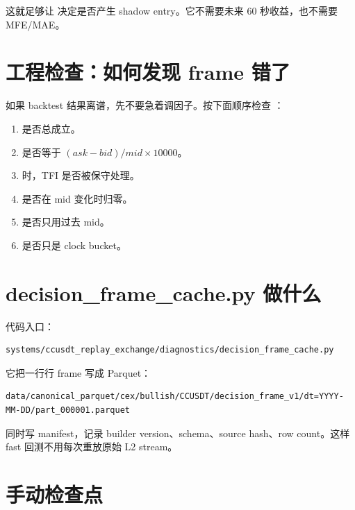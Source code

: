 这就足够让  决定是否产生 shadow entry。它不需要未来 60 秒收益，也不需要 MFE/MAE。

\section{工程检查：如何发现 frame 错了}

如果 backtest 结果离谱，先不要急着调因子。按下面顺序检查 ：

\begin{enumerate}[leftmargin=2em]
  \item {} 是否总成立。
  \item {} 是否等于 \((ask-bid)/mid\times10000\)。
  \item {} 时，TFI 是否被保守处理。
  \item {} 是否在 mid 变化时归零。
  \item {} 是否只用过去 mid。
  \item {} 是否只是 clock bucket。
\end{enumerate}


\section{decision\_frame\_cache.py 做什么}

代码入口：

\begin{lstlisting}
systems/ccusdt_replay_exchange/diagnostics/decision_frame_cache.py
\end{lstlisting}

它把一行行 frame 写成 Parquet：

\begin{lstlisting}
data/canonical_parquet/cex/bullish/CCUSDT/decision_frame_v1/dt=YYYY-MM-DD/part_000001.parquet
\end{lstlisting}

同时写 manifest，记录 builder version、schema、source hash、row count。这样 fast 回测不用每次重放原始 L2 stream。

\section{手动检查点}

